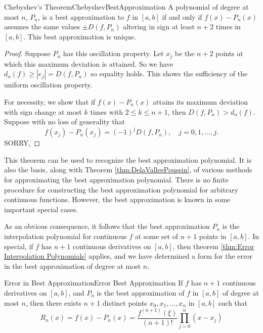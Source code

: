 \documentclass[../main.tex]{subfiles}
\begin{document}
\begin{theorem}{Chebyshev's Theorem}{ChebyshevBestApproximation}
	A polynomial of degree at most $n$, $P_n$, is a best approximation to $f$ in $[a,b]$ if and only if $f(x) - P_n(x)$ assumes the same values $\pm D(f, P_n)$ altering in sign at least $n+2$ times in $[a,b]$. This best approximation is unique.
\end{theorem}
\begin{proof}
	Suppose $P_n$ has this oscillation property. Let $x_j$ be the $n+2$ points at which this maximum deviation is attained. So we have $d_n(f) \geq |e_j| = D(f, P_n)$ so equality holds. This shows the sufficiency of the uniform oscillation property.

	For necessity, we show that if $f(x) - P_n(x)$ attains its maximum deviation with sign change at most $k$ times with $2 \leq k \leq n+1$, then $D(f, P_n) > d_n(f)$. Suppose with no loss of generality that
	\begin{equation*}
		f(x_j) - P_n(x_j) = (-1)^j D(f, P_n), \quad j = 0, 1, \dots, j.
	\end{equation*}
	SORRY,
\end{proof}

This theorem can be used to recognize the best approximation polynomial. It is also the basis, along with Theorem \ref{thm:DelaValleePoussin}, of various methods for approximating the best approximation polynomial. There is no finite procedure for constructing the best approximation polynomial for arbitrary continuous functions. However, the best approximation is known in some important special cases.

As an obvious consequence, it follows that the best approximation $P_n$ is the interpolation polynomial for continuous $f$ at some set of $n+1$ points in $[a,b]$. In special, if $f$ has $n+1$ continuous derivatives on $[a,b]$, then theorem \ref{thm:Error Interpolation Polynomials} applies, and we have determined a form for the error in the best approximation of degree at most $n$.

\begin{theorem}{Error in Best Approximation}{Error Best Approximation}
	If $f$ has $n+1$ continuous derivatives on $[a,b]$, and $P_n$ is the best approximation of $f$ in $[a,b]$ of degree at most $n$, then there exists $n+1$ distinct points $x_0, x_1, \dots, x_n$ in $[a,b]$ such that
	\begin{equation}
		R_n(x) = f(x) - P_n(x) = \frac{f^{(n+1)}(\xi)}{(n+1)!} \prod_{j=0}^n (x - x_j)
	\end{equation}
\end{theorem}
\end{document}
